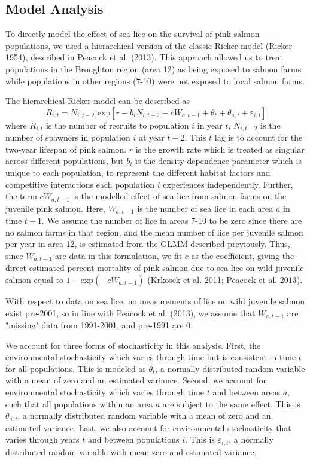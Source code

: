 \documentclass{article}
\begin{document}
\subsection{Model Analysis}

To directly model the effect of sea lice on the survival of pink salmon populations, we used a hierarchical version of the classic Ricker model (Ricker 1954), described in Peacock et al. (2013). This approach allowed us to treat populations in the Broughton region (area 12) as being exposed to salmon farms while populations in other regions (7-10) were not exposed to local salmon farms. 

The hierarchical Ricker model can be described as $$R_{i,t} = N_{i,t-2} \textrm{ exp} \left[r-b_i N_{i,t-2} -c W_{a,t-1} + \theta_{t} + \theta_{a,t} + \varepsilon_{i,t}\right]$$ where $R_{i,t}$ is the number of recruits to population $i$ in year $t$,  $N_{i,t-2}$ is the number of spawners in population $i$ at year $t-2$. This $t$ lag is to account for the two-year lifespan of pink salmon. $r$ is the growth rate which is treated as singular across different populations, but $b_i$ is the density-dependence parameter which is unique to each population, to represent the different habitat factors and competitive interactions each population $i$ experiences independently. Further, the term $cW_{a, t-1}$ is the modelled effect of sea lice from salmon farms on the juvenile pink salmon. Here, $W_{a, t-1}$ is the number of sea lice in each area $a$ in time $t-1$. We assume the number of lice in areas 7-10 to be zero since there are no salmon farms in that region, and the mean number of lice per juvenile salmon per year in area 12, is estimated from the GLMM described previously. Thus, since $W_{a, t-1}$ are data in this formulation, we fit $c$ as the coefficient, giving the direct estimated percent mortality of pink salmon due to sea lice on wild juvenile salmon equal to $1-\textrm{exp}(-cW_{a,t-1})$ (Krkosek et al. 2011; Peacock et al. 2013). 

With respect to data on sea lice, no measurements of lice on wild juvenile salmon exist pre-2001, so in line with Peacock et al. (2013), we assume that $W_{a,t-1}$ are "missing" data from 1991-2001, and pre-1991 are 0.

We account for three forms of stochasticity in this analysis. First, the environmental stochasticity which varies through time but is consistent in time $t$ for all populations. This is modeled as $\theta_t$, a normally distributed random variable with a mean of zero and an estimated variance. Second, we account for environmental stochasticity which varies through time $t$ and between areas $a$, such that all populations within an area $a$ are subject to the same effect. This is $\theta_{a,t}$, a normally distributed random variable with a mean of zero and an estimated variance. Last, we also account for environmental stochasticity that varies through years $t$ and between populations $i$. This is $\varepsilon_{i,t}$, a normally distributed random variable with mean zero and estimated variance. 
\end{document}
